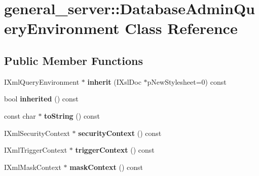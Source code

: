\hypertarget{classgeneral__server_1_1DatabaseAdminQueryEnvironment}{\section{general\-\_\-server\-:\-:\-Database\-Admin\-Query\-Environment \-Class \-Reference}
\label{classgeneral__server_1_1DatabaseAdminQueryEnvironment}
}
\subsection*{\-Public \-Member \-Functions}
\begin{DoxyCompactItemize}
\item 
\hypertarget{classgeneral__server_1_1DatabaseAdminQueryEnvironment_a0a9474d865f86a558b0771f9278f2223}{\-I\-Xml\-Query\-Environment $\ast$ {\bfseries inherit} (\-I\-Xsl\-Doc $\ast$p\-New\-Stylesheet=0) const }\label{classgeneral__server_1_1DatabaseAdminQueryEnvironment_a0a9474d865f86a558b0771f9278f2223}

\item 
\hypertarget{classgeneral__server_1_1DatabaseAdminQueryEnvironment_a226dee2c020faa19b00f36074a1e07ea}{bool {\bfseries inherited} () const }\label{classgeneral__server_1_1DatabaseAdminQueryEnvironment_a226dee2c020faa19b00f36074a1e07ea}

\item 
\hypertarget{classgeneral__server_1_1DatabaseAdminQueryEnvironment_a7375bacce62cb1e8238a1026fed936ed}{const char $\ast$ {\bfseries to\-String} () const }\label{classgeneral__server_1_1DatabaseAdminQueryEnvironment_a7375bacce62cb1e8238a1026fed936ed}

\item 
\hypertarget{classgeneral__server_1_1DatabaseAdminQueryEnvironment_a0f9b9b6c4dd599f18e564e191cfb8e71}{\-I\-Xml\-Security\-Context $\ast$ {\bfseries security\-Context} () const }\label{classgeneral__server_1_1DatabaseAdminQueryEnvironment_a0f9b9b6c4dd599f18e564e191cfb8e71}

\item 
\hypertarget{classgeneral__server_1_1DatabaseAdminQueryEnvironment_a1743d338496e35b8e1e59d3b527ea72d}{\-I\-Xml\-Trigger\-Context $\ast$ {\bfseries trigger\-Context} () const }\label{classgeneral__server_1_1DatabaseAdminQueryEnvironment_a1743d338496e35b8e1e59d3b527ea72d}

\item 
\hypertarget{classgeneral__server_1_1DatabaseAdminQueryEnvironment_aa38ca681a502180c6767eb92ebbe3f39}{\-I\-Xml\-Mask\-Context $\ast$ {\bfseries mask\-Context} () const }\label{classgeneral__server_1_1DatabaseAdminQueryEnvironment_aa38ca681a502180c6767eb92ebbe3f39}


\end{DoxyCompactItemize}
